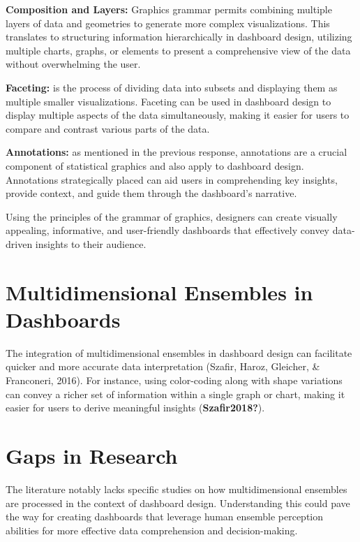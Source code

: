 \documentclass[print]{nuthesis}
\begin{document}
\textbf{Composition and Layers:} Graphics grammar permits combining multiple layers of data and geometries to generate more complex visualizations.
This translates to structuring information hierarchically in dashboard design, utilizing multiple charts, graphs, or elements to present a comprehensive view of the data without overwhelming the user.

\textbf{Faceting:} is the process of dividing data into subsets and displaying them as multiple smaller visualizations.
Faceting can be used in dashboard design to display multiple aspects of the data simultaneously, making it easier for users to compare and contrast various parts of the data.

\textbf{Annotations:} as mentioned in the previous response, annotations are a crucial component of statistical graphics and also apply to dashboard design.
Annotations strategically placed can aid users in comprehending key insights, provide context, and guide them through the dashboard's narrative.

Using the principles of the grammar of graphics, designers can create visually appealing, informative, and user-friendly dashboards that effectively convey data-driven insights to their audience.

\hypertarget{multidimensional-ensembles-in-dashboards}{%
\section{Multidimensional Ensembles in Dashboards}\label{multidimensional-ensembles-in-dashboards}}

The integration of multidimensional ensembles in dashboard design can facilitate quicker and more accurate data interpretation (Szafir, Haroz, Gleicher, \& Franconeri, 2016).
For instance, using color-coding along with shape variations can convey a richer set of information within a single graph or chart, making it easier for users to derive meaningful insights (\textbf{Szafir2018?}).

\hypertarget{gaps-in-research}{%
\section{Gaps in Research}\label{gaps-in-research}}

The literature notably lacks specific studies on how multidimensional ensembles are processed in the context of dashboard design.
Understanding this could pave the way for creating dashboards that leverage human ensemble perception abilities for more effective data comprehension and decision-making.
\end{document}
